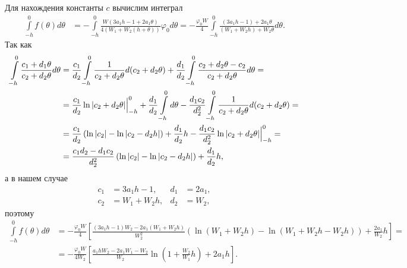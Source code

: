 \documentclass[a4paper,14pt]{article}
\begin{document}
Для нахождения константы $c$ вычислим интеграл
\begin{equation*}
  \begin{aligned}
    \int\limits_{-h}^{0} f(\theta) d\theta
    &=
      - \int\limits_{-h}^{0} \frac{W (3 a_1 h - 1 + 2 a_1 \theta)}{4 (W_1 + W_2 (h + \theta))} \varphi_0 d\theta
      =
      - \frac{\varphi_0 W}{4}
      \int\limits_{-h}^{0} \frac{(3 a_1 h - 1) + 2 a_1 \theta}{(W_1 + W_2 h) + W_2 \theta} d\theta.
  \end{aligned}
\end{equation*}
Так как
\begin{equation}
  \label{eq:int-formula}
  \begin{aligned}
    \int\limits_{-h}^{0} \frac{c_1 + d_1 \theta}{c_2 + d_2 \theta} d\theta
    &=
      \frac{c_1}{d_2} \int\limits_{-h}^{0} \frac{1}{c_2 + d_2 \theta} d(c_2 + d_2 \theta)
      +
      \frac{d_1}{d_2} \int\limits_{-h}^{0} \frac{c_2 + d_2 \theta - c_2}{c_2 + d_2 \theta} d\theta
      = \\
    &=
      \frac{c_1}{d_2} \ln \abs{c_2 + d_2 \theta} \Big|_{-h}^0
      +
      \frac{d_1}{d_2} \int\limits_{-h}^{0} d \theta
      -
      \frac{d_1 c_2}{d_2^2} \int\limits_{-h}^{0} \frac{1}{c_2 + d_2 \theta} d(c_2 + d_2 \theta)
      = \\
    &=
      \frac{c_1}{d_2} \left(
      \ln \abs{c_2} - \ln \abs{c_2 - d_2 h}
      \right)
      +
      \frac{d_1}{d_2} h
      -
      \frac{d_1 c_2}{d_2^2} \ln \abs{c_2 + d_2 \theta} \Big|_{-h}^0
      = \\
    &=
      \frac{c_1 d_2 - d_1 c_2}{d_2^2} \left(
      \ln \abs{c_2} - \ln \abs{c_2 - d_2 h}
      \right)
      +
      \frac{d_1}{d_2} h,
  \end{aligned}
\end{equation}
а в нашем случае
\begin{equation*}
  \begin{aligned}
    c_1
    &=
      3 a_1 h - 1, &
    d_1
    &=
      2 a_1, \\
    c_2
    &=
      W_1 + W_2 h,
    &
    d_2
    &=
      W_2,
  \end{aligned}
\end{equation*}
поэтому
\begin{equation*}
  \begin{aligned}
    \int\limits_{-h}^{0} f(\theta) d\theta
    &=
      - \frac{\varphi_0 W}{4} \left[
      \frac{(3 a_1 h - 1) W_2 - 2 a_1 (W_1 + W_2 h)}{W_2^2} \left(
      \ln \left( W_1 + W_2 h \right)
      -
      \ln \left( W_1 + W_2 h - W_2 h \right)
      \right)
      +
      \frac{2 a_1}{W_2} h
      \right] = \\
    &=
      - \frac{\varphi_0 W}{4 W_2} \left[
      \frac{a_1 h W_2 - 2 a_1 W_1 - W_2}{W_2}
      \ln \left( 1 +  \frac{W_2}{W_1} h \right)
      +
      2 a_1 h
      \right].
  \end{aligned}
\end{equation*}
\end{document}
